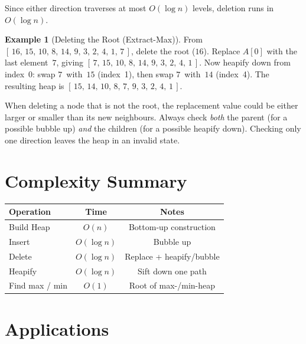 \documentclass[11pt, a4paper, notitlepage]{report}
\theoremstyle{definition}
\theoremstyle{remark}
\theoremstyle{definition}
\newtheorem{example}[theorem]{Example}
\begin{document}
Since either direction traverses at most $O(\log n)$ levels, deletion runs in $O(\log n)$.

\begin{example}[Deleting the Root (Extract-Max)]
\label{ex:heap-delete}
From $[\,16,\,15,\,10,\,8,\,14,\,9,\,3,\,2,\,4,\,1,\,7\,]$, delete the root ($16$).  Replace $A[0]$ with the last element~$7$, giving $[\,7,\,15,\,10,\,8,\,14,\,9,\,3,\,2,\,4,\,1\,]$.  Now heapify down from index~0: swap $7$~with~$15$ (index~1), then swap $7$~with~$14$ (index~4).  The resulting heap is $[\,15,\,14,\,10,\,8,\,7,\,9,\,3,\,2,\,4,\,1\,]$.
\end{example}

\begin{warning}[title={Common Mistake: Forgetting to Check Both Directions}]
When deleting a node that is not the root, the replacement value could be either larger or smaller than its new neighbours.  Always check \emph{both} the parent (for a possible bubble up) \emph{and} the children (for a possible heapify down).  Checking only one direction leaves the heap in an invalid state.
\end{warning}

\section{Complexity Summary}
\label{sec:heap-complexity}

\begin{center}
\begin{tabular}{lcc}
\toprule
\textbf{Operation} & \textbf{Time} & \textbf{Notes} \\
\midrule
Build Heap       & $O(n)$       & Bottom-up construction \\
Insert           & $O(\log n)$  & Bubble up \\
Delete           & $O(\log n)$  & Replace + heapify/bubble \\
Heapify          & $O(\log n)$  & Sift down one path \\
Find max / min   & $O(1)$       & Root of max-/min-heap \\
\bottomrule
\end{tabular}
\end{center}

\section{Applications}
\label{sec:heap-apps}
\end{document}
